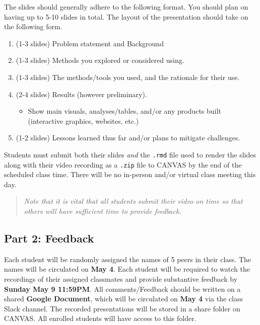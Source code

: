 \documentclass[
  12pt,
]{article}
\providecommand{\tightlist}{%
  \setlength{\itemsep}{0pt}\setlength{\parskip}{0pt}}
\begin{document}
The slides should generally adhere to the following format. You should
plan on having up to 5-10 slides in total. The layout of the
presentation should take on the following form.

\begin{enumerate}
\def\labelenumi{\arabic{enumi}.}
\item
  (1-3 slides) Problem statement and Background
\item
  (1-3 slides) Methods you explored or considered using.
\item
  (1-3 slides) The methods/tools you used, and the rationale for their
  use.
\item
  (2-4 slides) Results (however preliminary).

  \begin{itemize}
  \tightlist
  \item
    Show main visuals, analyses/tables, and/or any products built
    (interactive graphics, websites, etc.)
  \end{itemize}
\item
  (1-2 slides) Lessons learned thus far and/or plans to mitigate
  challenges.
\end{enumerate}

Students must submit both their slides \emph{and} the \texttt{.rmd} file
used to render the slides along with their video recording as a
\texttt{.zip} file to CANVAS by the end of the scheduled class time.
There will be no in-person and/or virtual class meeting this day.

\begin{quote}
\emph{Note that it is vital that all students submit their video on time
so that others will have sufficient time to provide feedback.}
\end{quote}

\hypertarget{part-2-feedback}{%
\subsection{Part 2: Feedback}\label{part-2-feedback}}

Each student will be randomly assigned the names of 5 peers in their
class. The names will be circulated on \textbf{May 4}. Each student will
be required to watch the recordings of their assigned classmates and
provide substantive feedback by \textbf{Sunday May 9 11:59PM}. All
comments/Feedback should be written on a shared \textbf{Google
Document}, which will be circulated on \textbf{May 4} via the class
Slack channel. The recorded presentations will be stored in a share
folder on CANVAS. All enrolled students will have access to this folder.
\end{document}
